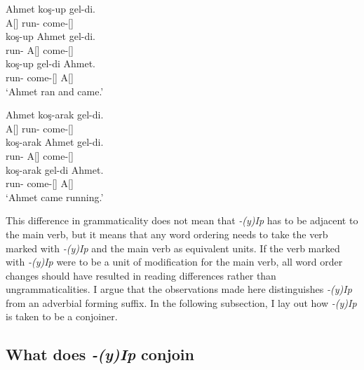 \begin{exe}
\ex \label{ipandwordorder}
\begin{xlist}
    \ex \begin{xlisti}
        \ex \gll Ahmet koş-up gel-di. \\ 
        A[{\Nom}] run-{\Pc} come-{\Pst}[{\Tsg}] \\
        
        \ex \gll *koş-up Ahmet gel-di. \\ 
        run-{\Pc} A[{\Nom}] come-{\Pst}[{\Tsg}] \\
        
        \ex \gll koş-up gel-di Ahmet. \\ 
        run-{\Pc} come-{\Pst}[{\Tsg}] A[{\Nom}] \\
        \glt `Ahmet ran and came.'
    \end{xlisti}
    
    \ex \begin{xlisti}
        \ex \gll Ahmet koş-arak gel-di. \\ 
        A[{\Nom}] run-{\By} come-{\Pst}[{\Tsg}] \\
        
        \ex \gll koş-arak Ahmet gel-di. \\ 
        run-{\By} A[{\Nom}] come-{\Pst}[{\Tsg}] \\
        
        \ex \gll koş-arak gel-di Ahmet. \\ 
        run-{\By} come-{\Pst}[{\Tsg}] A[{\Nom}] \\
        \glt `Ahmet came running.'
        \end{xlisti}
    \end{xlist}
\end{exe}

This difference in grammaticality does not mean that \textit{-(y)Ip} has to be adjacent to the main verb, but it means that any word ordering needs to take the verb marked with \textit{-(y)Ip} and the main verb as equivalent units. If the verb marked with \textit{-(y)Ip} were to be a unit of modification for the main verb, all word order changes should have resulted in reading differences rather than ungrammaticalities. I argue that the observations made here distinguishes \textit{-(y)Ip} from an adverbial forming suffix. In the following subsection, I lay out how \textit{-(y)Ip} is taken to be a conjoiner.


\subsection{What does \textit{-(y)Ip} conjoin}

